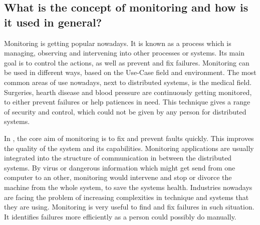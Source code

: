 \subsection{What is the concept of monitoring and how is it used in general?}

\label{subsec:ConceptMonitoring}
Monitoring is getting popular nowadays. 
It is known as a process which is managing, observing and intervening into other processes or systems.\cite{Jammes2012} 
Its main goal is to control the actions, as well as prevent and fix failures.\cite{Dinu2011} 
Monitoring can be used in different ways, based on the Use-Case field and environment.\cite{Dinu2011} 
The most common areas of use nowadays, next to distributed systems,\cite{Jammes2012} is the medical field. 
Surgeries, hearth disease and blood pressure are continuously getting monitored, to either prevent failures or help patiences in need. 
This technique gives a range of security and control, which could not be given by any person for distributed systems.\cite{Jammes2012}

 In \isds, the core aim of monitoring is to fix and prevent faults quickly. 
 This improves the quality of the system and its capabilities. 
 Monitoring applications are usually integrated into the structure of communication in between the distributed systems.\cite{Jammes2012} 
 By virus or dangerous information which might get send from one computer to an other, monitoring would intervene and stop or divorce the machine from the whole system, to save the systems health. 
 Industries nowadays are facing the problem of increasing complexities in technique and systems that they are using.\cite{Jammes2012} 
 Monitoring is very useful to find and fix failures in such situation. 
 It identifies failures more efficiently as a person could possibly do manually.\cite{Jammes2012}
 

